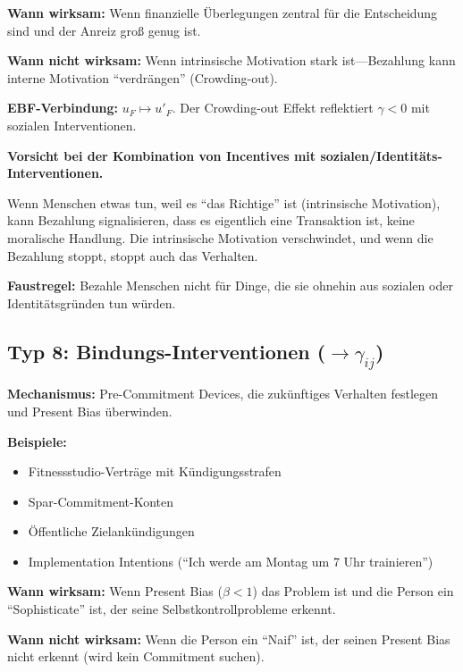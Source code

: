 \textbf{Wann wirksam:} Wenn finanzielle Überlegungen zentral für die Entscheidung sind und der Anreiz groß genug ist.

\textbf{Wann nicht wirksam:} Wenn intrinsische Motivation stark ist---Bezahlung kann interne Motivation ``verdrängen'' (Crowding-out).

\textbf{EBF-Verbindung:} $u_F \mapsto u'_F$. Der Crowding-out Effekt reflektiert $\gamma < 0$ mit sozialen Interventionen.

\begin{tcolorbox}[colback=red!5!white, colframe=red!75!black,
    title=Warnung: Crowding Out]
\textbf{Vorsicht bei der Kombination von Incentives mit sozialen/Identitäts-Interventionen.}

Wenn Menschen etwas tun, weil es ``das Richtige'' ist (intrinsische Motivation), kann Bezahlung signalisieren, dass es eigentlich eine Transaktion ist, keine moralische Handlung. Die intrinsische Motivation verschwindet, und wenn die Bezahlung stoppt, stoppt auch das Verhalten.

\textbf{Faustregel:} Bezahle Menschen nicht für Dinge, die sie ohnehin aus sozialen oder Identitätsgründen tun würden.
\end{tcolorbox}


\subsection{Typ 8: Bindungs-Interventionen ($\rightarrow \gamma_{ij}$)}
\label{sec:17-type-binding}

\textbf{Mechanismus:} Pre-Commitment Devices, die zukünftiges Verhalten festlegen und Present Bias überwinden.

\textbf{Beispiele:}
\begin{itemize}[nosep]
\item Fitnessstudio-Verträge mit Kündigungsstrafen
\item Spar-Commitment-Konten \citep{ashraf2006}
\item Öffentliche Zielankündigungen
\item Implementation Intentions (``Ich werde am Montag um 7 Uhr trainieren'')
\end{itemize}

\textbf{Wann wirksam:} Wenn Present Bias ($\beta < 1$) das Problem ist und die Person ein ``Sophisticate'' ist, der seine Selbstkontrollprobleme erkennt.

\textbf{Wann nicht wirksam:} Wenn die Person ein ``Naif'' ist, der seinen Present Bias nicht erkennt (wird kein Commitment suchen).


